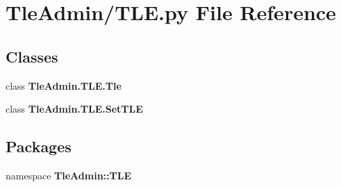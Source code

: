 \section{\-Tle\-Admin/\-T\-L\-E.py \-File \-Reference}
\label{_t_l_e_8py}
\subsection*{\-Classes}
\begin{DoxyCompactItemize}
\item 
class {\bf \-Tle\-Admin.\-T\-L\-E.\-Tle}
\item 
class {\bf \-Tle\-Admin.\-T\-L\-E.\-Set\-T\-L\-E}
\end{DoxyCompactItemize}
\subsection*{\-Packages}
\begin{DoxyCompactItemize}
\item 
namespace {\bf \-Tle\-Admin\-::\-T\-L\-E}
\end{DoxyCompactItemize}
